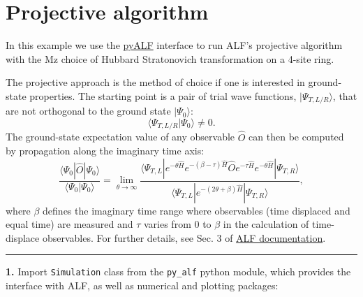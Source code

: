     
    

    
    \hypertarget{projective-algorithm}{%
\section{Projective algorithm}\label{projective-algorithm}}

    In this example we use the
\href{https://git.physik.uni-wuerzburg.de/ALF/pyALF/-/tree/ALF-2.4/}{pyALF}
interface to run ALF's projective algorithm with the Mz choice of
Hubbard Stratonovich transformation on a 4-site ring.

The projective approach is the method of choice if one is interested in
ground-state properties. The starting point is a pair of trial wave
functions, \(|\Psi_{T,L/R} \rangle\), that are not orthogonal to the
ground state \(|\Psi_0 \rangle\): \[
  \langle \Psi_{T,L/R}  | \Psi_0 \rangle  \neq 0. 
\] The ground-state expectation value of any observable \(\hat{O}\) can
then be computed by propagation along the imaginary time axis: \[
     \frac{ \langle \Psi_0 | \hat{O} | \Psi_0 \rangle }{ \langle \Psi_0 | \Psi_0 \rangle}   = \lim_{\theta \rightarrow \infty}  
     \frac{ \langle \Psi_{T,L} | e^{-\theta \hat{H}}  e^{-(\beta - \tau)\hat{H}  }\hat{O} e^{- \tau  \hat{H} }   e^{-\theta \hat{H}} | \Psi_{T,R} \rangle } 
            { \langle \Psi_{T,L} | e^{-(2 \theta + \beta) \hat{H}  } | \Psi_{T,R} \rangle } ,
\] where \(\beta\) defines the imaginary time range where observables
(time displaced and equal time) are measured and \(\tau\) varies from
\(0\) to \(\beta\) in the calculation of time-displace observables. For
further details, see Sec. 3 of
\href{https://git.physik.uni-wuerzburg.de/ALF/ALF/-/blob/master/Documentation/doc.pdf}{ALF
documentation}.

\begin{center}\rule{0.5\linewidth}{0.5pt}\end{center}

\textbf{1.} Import \texttt{Simulation} class from the \texttt{py\_alf}
python module, which provides the interface with ALF, as well as
numerical and plotting packages:

